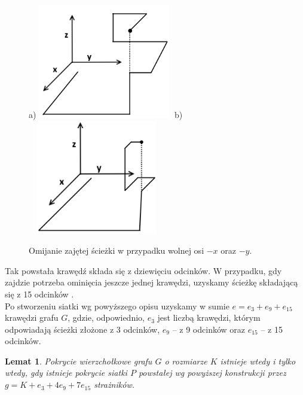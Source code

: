 \documentclass{xmgr}
\newtheorem{Lemat}{Lemat}
\theoremstyle{definition}
\begin{document}
\begin{figure}[ht!]
  \centering
  a)\includegraphics[width=6cm,height=5cm]{rysunki/zajete_z.png}
  b)\includegraphics[width=6cm,height=5cm]{rysunki/zajete_z2.png}
  \caption{Omijanie zajętej ścieżki w przypadku wolnej osi $-x$ oraz $-y$.}
  \label{fig:nakladanie}
\end{figure} 

Tak powstała krawędź składa się z dziewięciu odcinków. W przypadku, gdy zajdzie potrzeba ominięcia jeszcze jednej krawędzi, uzyskamy ścieżkę składającą się z 15 odcinków \cite{orourke}.
\\\indent Po stworzeniu siatki wg powyższego opisu uzyskamy w sumie $e = e_3 + e_9 + e_{15}$ krawędzi grafu $G$, gdzie, odpowiednio, $e_3$  jest liczbą krawędzi, którym odpowiadają ścieżki złożone z 3 odcinków, $e_9$ -- z 9 odcinków oraz $e_{15}$ -- z 15 odcinków.

\begin{Lemat} \cite{orourke} \label{pokrycie wierzcholkowe}
	Pokrycie wierzchołkowe grafu $G$ o rozmiarze $K$ istnieje wtedy i tylko wtedy, gdy istnieje pokrycie siatki $P$ powstałej wg powyższej konstrukcji przez $g = K + e_3 + 4e_9 + 7e_{15}$ strażników.
\end{Lemat}
\end{document}
